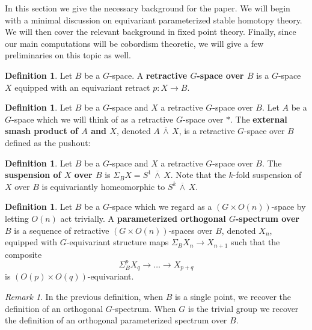 \documentclass[11pt]{amsart}
\newcommand{\barsmash}{\,\overline\wedge\,}
\theoremstyle{plain}   %
\theoremstyle{definition}
\newtheorem{df}[thm]{Definition}
\theoremstyle{remark}
\newtheorem{rmk}[thm]{Remark}
\numberwithin{equation}{section}
\begin{document}
In this section we give the necessary background for the paper. We will begin with a minimal discussion on equivariant parameterized stable homotopy theory. We will then cover the relevant background in fixed point theory. Finally, since our main computations will be cobordism theoretic, we will give a few preliminaries on this topic as well.

\begin{df}
Let $B$ be a $G$-space. A \textbf{retractive $G$-space over $B$} is a $G$-space $X$ equipped with an equivariant retract $p\colon X\to B$. 
\end{df}

\begin{df}\label{df:external smash}
Let $B$ be a $G$-space and $X$ a retractive $G$-space over $B$. Let $A$ be a $G$-space which we will think of as a retractive $G$-space over $*$. The \textbf{external smash product of $A$ and $X$}, denoted $A\barsmash X$, is a retractive $G$-space over $B$ defined as the pushout:
\begin{figure}[H]
\center
{}
\end{figure}
\end{df}


\begin{df}\label{df:suspension}
Let $B$ be a $G$-space and $X$ a retractive $G$-space over $B$. The \textbf{suspension of $X$ over $B$} is $\Sigma_B X=S^1\barsmash X$. Note that the $k$-fold suspension of $X$ over $B$ is equivariantly homeomorphic to $S^k\barsmash X$. 
\end{df}

\begin{df}
Let $B$ be a $G$-space which we regard as a $(G\times O(n))$-space by letting $O(n)$ act trivially. A \textbf{parameterized orthogonal $G$-spectrum over $B$} is a sequence of retractive $(G\times O(n))$-spaces over $B$, denoted $X_n$, equipped with $G$-equivariant structure maps $\Sigma_BX_n\to X_{n+1}$ such that the composite 
\[
\Sigma_B^p X_q \to \dots \to X_{p+q}
\]
is $(O(p)\times O(q))$-equivariant. 
\end{df}

\begin{rmk}
In the previous definition, when $B$ is a single point, we recover the definition of an orthogonal $G$-spectrum. When $G$ is the trivial group we recover the definition of an orthogonal parameterized spectrum over $B$. 
\end{rmk}
\end{document}
